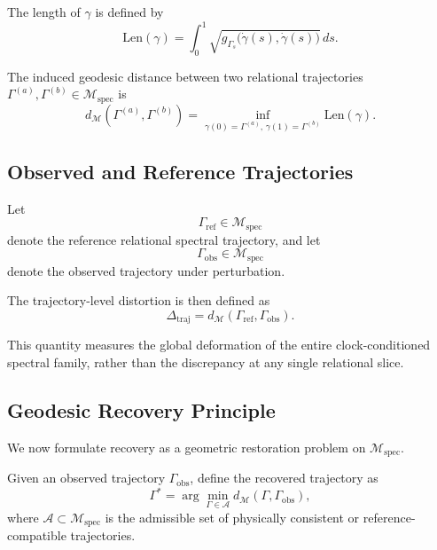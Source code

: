 \documentclass[11pt,a4paper]{article}
\theoremstyle{definition}
\theoremstyle{remark}
\begin{document}
The length of $\gamma$ is defined by
\begin{equation}
\mathrm{Len}(\gamma)
=
\int_0^1
\sqrt{
g_{\Gamma_s}\!\bigl(\dot{\gamma}(s),\dot{\gamma}(s)\bigr)
}
\, ds.
\end{equation}

The induced geodesic distance between two relational trajectories
$\Gamma^{(a)}, \Gamma^{(b)} \in \mathcal{M}_{\mathrm{spec}}$
is
\begin{equation}
d_{\mathcal{M}}
\!\left(
\Gamma^{(a)}, \Gamma^{(b)}
\right)
=
\inf_{\gamma(0)=\Gamma^{(a)},\, \gamma(1)=\Gamma^{(b)}}
\mathrm{Len}(\gamma).
\end{equation}

\subsection{Observed and Reference Trajectories}

Let
\begin{equation}
\Gamma_{\mathrm{ref}} \in \mathcal{M}_{\mathrm{spec}}
\end{equation}
denote the reference relational spectral trajectory, and let
\begin{equation}
\Gamma_{\mathrm{obs}} \in \mathcal{M}_{\mathrm{spec}}
\end{equation}
denote the observed trajectory under perturbation.

The trajectory-level distortion is then defined as
\begin{equation}
\Delta_{\mathrm{traj}}
=
d_{\mathcal{M}}
\!\left(
\Gamma_{\mathrm{ref}}, \Gamma_{\mathrm{obs}}
\right).
\end{equation}

This quantity measures the global deformation of the entire clock-conditioned spectral family, rather than the discrepancy at any single relational slice.

\subsection{Geodesic Recovery Principle}

We now formulate recovery as a geometric restoration problem on $\mathcal{M}_{\mathrm{spec}}$.

Given an observed trajectory $\Gamma_{\mathrm{obs}}$, define the recovered trajectory as
\begin{equation}
\Gamma^{*}
=
\arg\min_{\Gamma \in \mathcal{A}}
d_{\mathcal{M}}
\!\left(
\Gamma, \Gamma_{\mathrm{obs}}
\right),
\end{equation}
where $\mathcal{A} \subset \mathcal{M}_{\mathrm{spec}}$ is the admissible set of physically consistent or reference-compatible trajectories.
\end{document}
